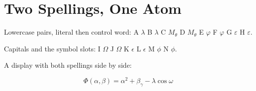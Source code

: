 \documentclass{article}
\begin{document}
\section{Two Spellings, One Atom}

Lowercase pairs, literal then control word: A $λ$ B $\lambda$ C $M_θ$ D
$M_\theta$ E $φ$ F $\varphi$ G $ε$ H $\varepsilon$.

Capitals and the symbol slots: I $Ω$ J $\Omega$ K $ϵ$ L $\epsilon$ M $ϕ$ N
$\phi$.

A display with both spellings side by side:

\[ Φ(α, β) = α^2 + β_γ - λ \cos ω \]
\end{document}
